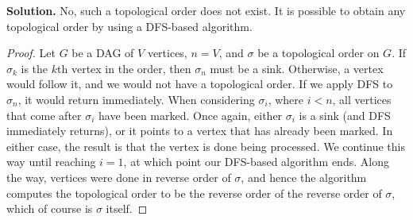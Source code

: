 \documentclass[12pt, a4paper]{article}
\newenvironment{sol}[1][Solution]
{\par\medskip\noindent \textbf{#1.} }
{\medskip}
\begin{document}
	\begin{sol}
		No, such a topological order does not exist. It is possible to obtain any
		topological order by using a DFS-based algorithm.
		\begin{proof}
			Let $G$ be a DAG of $V$ vertices, $n=V$, and $\sigma$ be a topological order on $G$.
			If $\sigma_k$ is the $k$th vertex in the order, then $\sigma_n$ must be a sink. Otherwise,
			a vertex would follow it, and we would not have a topological order. If we
			apply DFS to $\sigma_n$, it would return immediately.
			When considering $\sigma_i$, where $i<n$, all vertices that come after $\sigma_i$
			have been marked. Once again, either $\sigma_i$ is a sink (and DFS immediately
			returns), or it points to a vertex that has already been marked. In either case,
			the result is that the vertex is done being processed. We continue this way
			until reaching $i=1$, at which point our DFS-based algorithm ends. Along the way,
			vertices were done in reverse order of $\sigma$, and hence the algorithm
			computes the topological order to be the reverse order of the reverse order
			of $\sigma$, which of course is $\sigma$ itself.
		\end{proof}
	\end{sol}
	
\end{document}
